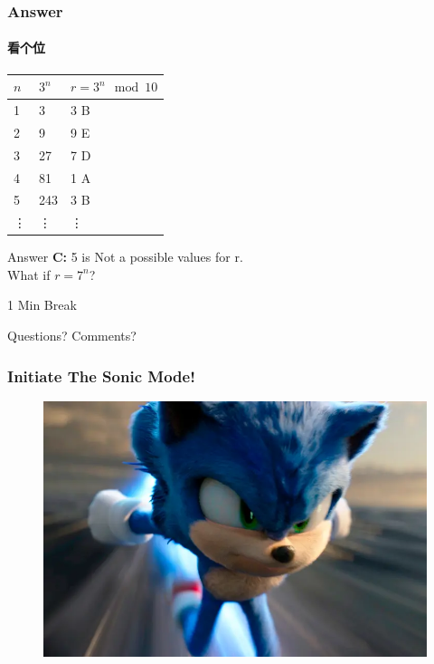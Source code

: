 \documentclass[
	11pt, %
	handout,
]{beamer}
\begin{document}
\begin{frame}
	\frametitle{Answer}
	\framesubtitle{看个位}

		\begin{table}
		\begin{tabular}{l l l}
			\toprule
			\textbf{$n$} & \textbf{$3^n$} & \textbf{$r = 3^n \mod 10$} \\
			\midrule
			1& 3 & 3  \alert{B}\\
			2& 9 & 9 \alert{E}\\
			3& 27 & 7 \alert{D}\\
			4& 81 & 1 \alert{A}\\
			5& 243 & 3 \alert{B}\\
			\vdots &\vdots & \vdots\\
			\bottomrule
		\end{tabular}
	\end{table}

	

\bigskip
Answer \textbf{C: } 5 is Not a possible values for r. \\
What if $r=7^n$?
\end{frame}


\begin{frame}[plain] %
	\begin{center}
		{\Huge 1 Min Break}
		\bigskip\bigskip %
		
		{\LARGE Questions? Comments?}
	\end{center}
\end{frame}


\begin{frame}
\frametitle{Initiate The Sonic Mode!}
		\begin{figure}
			\includegraphics[width=\linewidth]{Sonic.png}
		\end{figure}
\end{frame}
\end{document}
